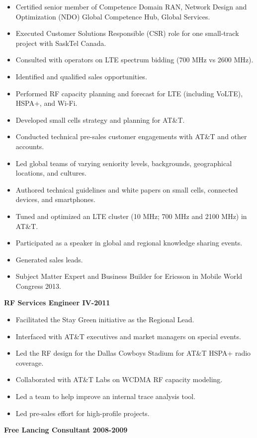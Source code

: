 \documentclass{article}
\begin{document}
\begin{itemize}
\item Certified senior member of Competence Domain RAN, Network Design and Optimization (NDO) Global Competence Hub, Global Services. 
\item Executed Customer Solutions Responsible (CSR) role for one small-track project with SaskTel Canada. 
\item Consulted with operators on LTE spectrum bidding (700 MHz vs 2600 MHz). 
\item Identified and qualified sales opportunities. 
\item Performed RF capacity planning and forecast for LTE (including VoLTE), HSPA+, and Wi-Fi. 
\item Developed small cells strategy and planning for AT\&T. 
\item Conducted technical pre-sales customer engagements with AT\&T and other accounts. 
\item Led global teams of varying seniority levels, backgrounds, geographical locations, and cultures. 
\item Authored technical guidelines and white papers on small cells, connected devices, and smartphones. 
\item Tuned and optimized an LTE cluster (10 MHz; 700 MHz and 2100 MHz) in AT\&T. 
\item Participated as a speaker in global and regional knowledge sharing events. 
\item Generated sales leads. 
\item Subject Matter Expert and Business Builder for Ericsson in Mobile World Congress 2013.
\end{itemize}
\textbf{RF Services Engineer IV\hfill{}-2011}
\begin{itemize}
\item Facilitated the Stay Green initiative as the Regional Lead.
\item Interfaced with AT\&T executives and market managers on special events. 
\item Led the RF design for the Dallas Cowboys Stadium for AT\&T HSPA+ radio coverage.
\item Collaborated with AT\&T Labs on WCDMA RF capacity modeling.
\item Led a team to help improve an internal trace analysis tool.
\item Led pre-sales effort for high-profile projects.
\end{itemize}
\textbf{Free Lancing Consultant \hfill 2008-2009} \\
\end{document}

